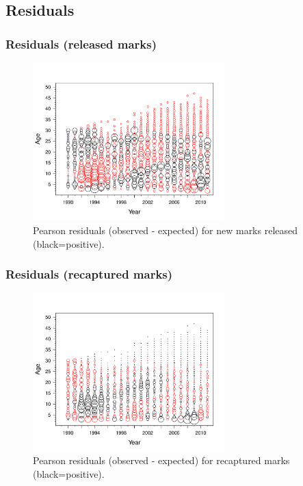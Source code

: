 \documentclass{beamer}
\begin{document}
\subsection{Residuals} %
\label{sub:residuals}
\begin{frame}[t]\frametitle{Residuals (released marks)}
	\begin{figure}[htbp]
		\centering
			\includegraphics[height=2.4in]{../../FIGS/ASMR/fig:epsilon.pdf}
		\caption{Pearson residuals (observed - expected) for new marks released (black=positive).}
		\label{fig:FIGS_ASMR_fig:epsilon}
	\end{figure}
\end{frame}
\begin{frame}[t]\frametitle{Residuals (recaptured marks)}
	\begin{figure}[htbp]
		\centering
			\includegraphics[height=2.4in]{../../FIGS/ASMR/fig:delta.pdf}
		\caption{Pearson residuals (observed - expected) for recaptured marks (black=positive).}
		\label{fig:FIGS_ASMR_fig:delta}
	\end{figure}
\end{frame}
%
\end{document}
